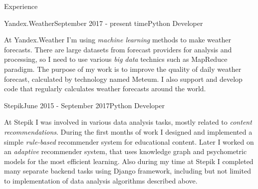 \documentclass{resume} %
\begin{document}
\begin{rSection}{Experience}

\begin{rSubsection}{Yandex.Weather}{September 2017 - present time}{Python Developer}{}
\item At Yandex.Weather I'm using \textit{machine learning} methods to make weather forecasts. There are large datasets from forecast providers for analysis and processing, so I need to use various \textit{big data} technics such as MapReduce paradigm. The purpose of my work is to improve the quality of daily weather forecast, calculated by technology named Meteum. I also support and develop code that regularly calculates weather forecasts around the world.

\end{rSubsection}


\begin{rSubsection}{Stepik}{June 2015 - September 2017}{Python Developer}{}
\item At Stepik I was involved in various data analysis tasks, mostly related to \textit{content recommendations}. During the first months of work I designed and implemented a simple \textit{rule-based} recommender system for educational content. Later I worked on an \textit{adaptive} recommender system, that uses knowledge graph and psychometric models for the most efficient learning. Also during my time at Stepik I completed many separate backend tasks using Django framework, including but not limited to implementation of data analysis algorithms described above.
\end{rSubsection}






\end{rSection}
\end{document}

